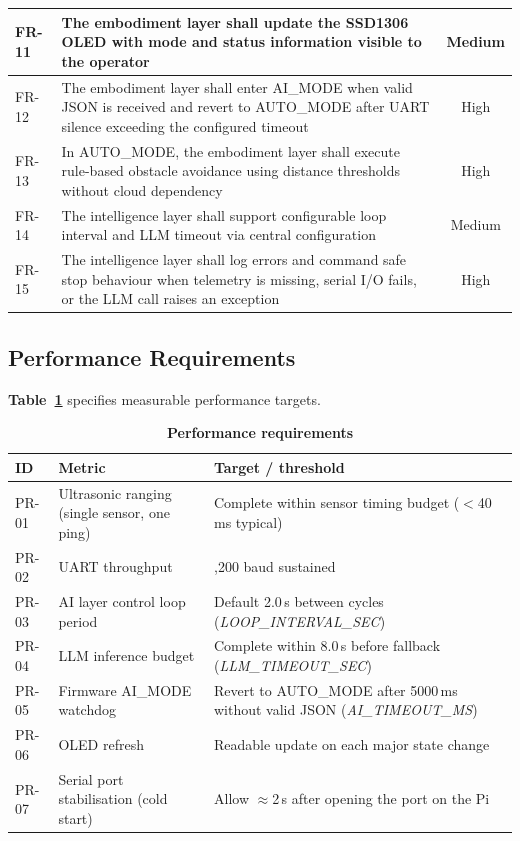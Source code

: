 \begin{longtable}{|l|p{11cm}|c|}
\hline
FR-11 & The embodiment layer shall update the SSD1306 OLED with mode and status information visible to the operator & Medium \\
\hline
FR-12 & The embodiment layer shall enter AI\_MODE when valid JSON is received and revert to AUTO\_MODE after UART silence exceeding the configured timeout & High \\
\hline
FR-13 & In AUTO\_MODE, the embodiment layer shall execute rule-based obstacle avoidance using distance thresholds without cloud dependency & High \\
\hline
FR-14 & The intelligence layer shall support configurable loop interval and LLM timeout via central configuration & Medium \\
\hline
FR-15 & The intelligence layer shall log errors and command safe stop behaviour when telemetry is missing, serial I/O fails, or the LLM call raises an exception & High \\
\end{longtable}

\subsection{Performance Requirements}
\label{subsec:perf_req}

\textbf{Table~\ref{tab:perf_req}} specifies measurable performance targets.

\begin{table}[H]
\centering
\caption[Performance requirements]{\textbf{Performance requirements}}
\label{tab:perf_req}
\begin{tabularx}{\textwidth}{|>{\raggedright\arraybackslash}p{2.2cm}|>{\raggedright\arraybackslash}X|>{\raggedright\arraybackslash}X|}
\hline
\textbf{ID} & \textbf{Metric} & \textbf{Target / threshold} \\
\hline
PR-01 & Ultrasonic ranging (single sensor, one ping) & Complete within sensor timing budget ($<$40\,ms typical) \\
\hline
PR-02 & UART throughput & 115,200 baud sustained \\
\hline
PR-03 & AI layer control loop period & Default 2.0\,s between cycles (\textit{LOOP\_INTERVAL\_SEC}) \\
\hline
PR-04 & LLM inference budget & Complete within 8.0\,s before fallback (\textit{LLM\_TIMEOUT\_SEC}) \\
\hline
PR-05 & Firmware AI\_MODE watchdog & Revert to AUTO\_MODE after 5000\,ms without valid JSON (\textit{AI\_TIMEOUT\_MS}) \\
\hline
PR-06 & OLED refresh & Readable update on each major state change \\
\hline
PR-07 & Serial port stabilisation (cold start) & Allow $\approx$2\,s after opening the port on the Pi \\
\hline
\end{tabularx}
\end{table}

